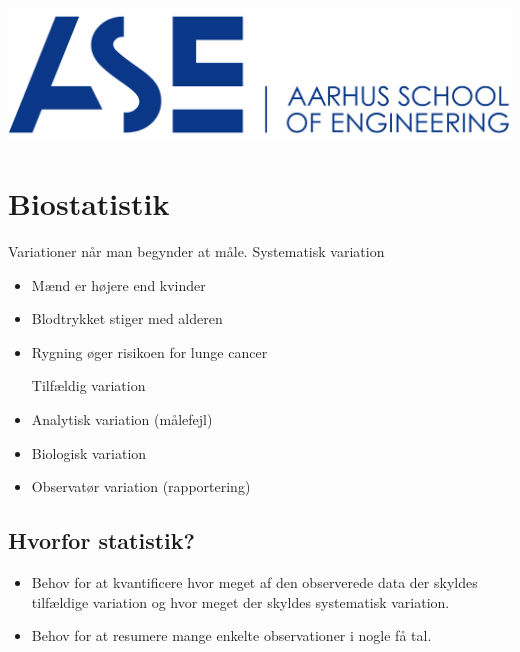\documentclass[12pt, letterpaper]{article}
\begin{document}
\begin{titlepage}
\includegraphics[scale=0.5]{billeder/au}\\ %
 

\vfill %


\end{titlepage}
\tableofcontents
\newpage

\section{Biostatistik}

Variationer når man begynder at måle.
Systematisk variation
\begin{itemize}
\item Mænd er højere end kvinder
\item Blodtrykket stiger med alderen
\item Rygning øger risikoen for lunge cancer \newline


Tilfældig variation

\item Analytisk variation (målefejl)
\item Biologisk variation
\item Observatør variation (rapportering)
\end{itemize}

\subsection{Hvorfor statistik?}
\begin{itemize}
\item Behov for at kvantificere hvor meget af den observerede data der skyldes tilfældige variation og hvor meget der skyldes systematisk variation. \newline
\item Behov for at resumere mange enkelte observationer i nogle få tal.
\end{itemize}
\end{document}
